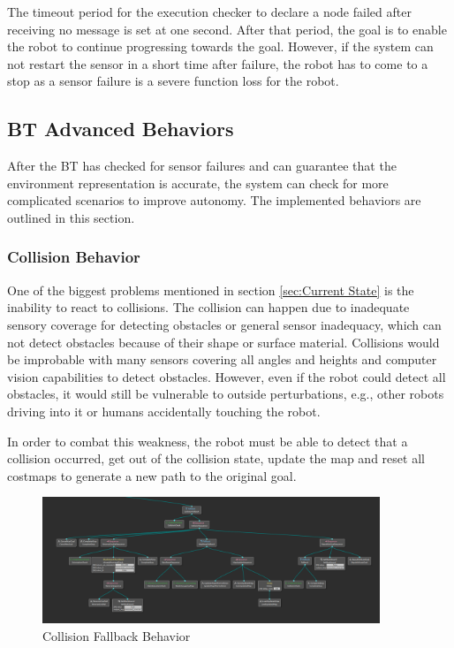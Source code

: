 The timeout period for the execution checker to declare a node failed after receiving no message is set at one second. After that period, the goal is to enable the robot to continue progressing towards the goal. However, if the system can not restart the sensor in a short time after failure, the robot has to come to a stop as a sensor failure is a severe function loss for the robot.

\subsection{BT Advanced Behaviors}

After the BT has checked for sensor failures and can guarantee that the environment representation is accurate, the system can check for more complicated scenarios to improve autonomy. The implemented behaviors are outlined in this section. 

\subsubsection{Collision Behavior}

One of the biggest problems mentioned in section \ref{sec:Current State} is the inability to react to collisions. The collision can happen due to inadequate sensory coverage for detecting obstacles or general sensor inadequacy, which can not detect obstacles because of their shape or surface material. Collisions would be improbable with many sensors covering all angles and heights and computer vision capabilities to detect obstacles. However, even if the robot could detect all obstacles, it would still be vulnerable to outside perturbations, e.g., other robots driving into it or humans accidentally touching the robot. 

In order to combat this weakness, the robot must be able to detect that a collision occurred, get out of the collision state, update the map and reset all costmaps to generate a new path to the original goal. 

\begin{figure}[ht]
	\centering
	\includegraphics[width=0.9\textwidth]{images/collision_fallback.png}
	\caption{Collision Fallback Behavior}
	\label{fig:collision_fallback}
\end{figure}

